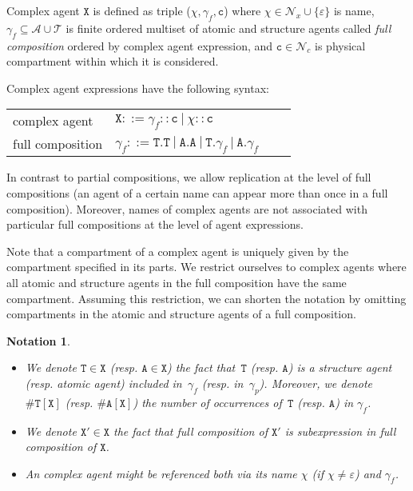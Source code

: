 \documentclass{entcs}
\renewcommand{\~}[0]{\texttildelow}
\newtheorem{notation}[thm]{Notation}
\begin{document}
\begin{definition}
Complex agent $\mathtt{X}$ is defined as triple ($\chi, \gamma_f, \mathtt{c}$) where $\chi \in \mathcal{N}_{x} \cup \{\varepsilon\}$ is name, $\gamma_f \subseteq \mathcal{A} \cup \mathcal{T}$ is finite ordered multiset of atomic and structure agents called \emph{full composition} ordered by complex agent expression, and $\mathtt{c} \in \mathcal{N}_{c}$ is physical compartment within which it is considered.
\end{definition}

Complex agent expressions have the following syntax:

\begin{center}
{\small
\hspace*{-1 cm}\begin{tabular}{ ll ll }
 complex agent & $\mathtt{X}::=\gamma_f::\mathtt{c}~|~\chi::\mathtt{c}$\\
 full composition & $\gamma_f ::= \mathtt{T}.\mathtt{T}~|~\mathtt{A}.\mathtt{A}~|~\mathtt{T}.\gamma_{f}~|~\mathtt{A}.\gamma_{f}$
\end{tabular}
}
\end{center}

In contrast to partial compositions, we allow replication at the level of full compositions (an agent of a certain name can appear more than once in a full composition). Moreover, names of complex agents are not associated with particular full compositions at the level of agent expressions.

Note that a compartment of a complex agent is uniquely given by the compartment specified in its parts. We restrict ourselves to complex agents where all atomic and structure agents in the full composition have the same compartment. Assuming this restriction, we can shorten the notation by omitting compartments in the atomic and structure agents of a full composition. 

\begin{notation}
~
\begin{itemize}
\item  We denote $\mathtt{T}\in \mathtt{X}$ (resp. $\mathtt{A}\in \mathtt{X}$) the fact that~$\mathtt{T}$ (resp. $\mathtt{A}$) is a structure agent (resp. atomic agent) included in~$\gamma_f$ (resp. in~$\gamma_p$). 
Moreover, we denote $\#\mathtt{T}[\mathtt{X}]$ (resp. $\#\mathtt{A}[\mathtt{X}]$) the number of occurrences of~$\mathtt{T}$ (resp. $\mathtt{A}$) in $\gamma_f$. 
\item We denote $\mathtt{X}' \in \mathtt{X}$ the fact that full composition of $\mathtt{X}'$ is subexpression in full composition of $\mathtt{X}$.
\item An complex agent might be referenced both via its name $\chi$ (if $\chi \neq \varepsilon$) and $\gamma_f$.
\end{itemize}
\end{notation}
\end{document}
